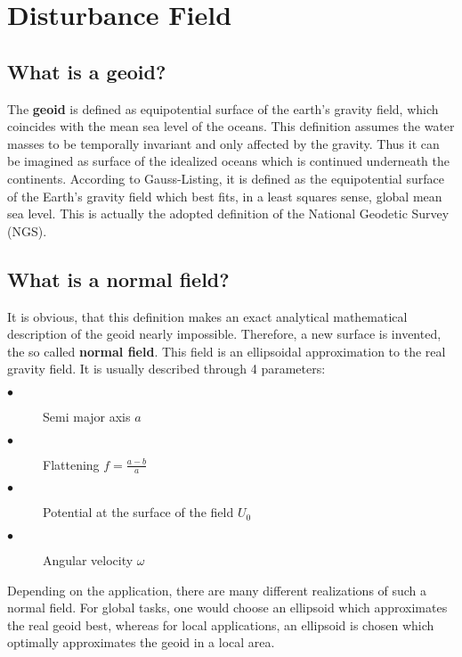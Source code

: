 \documentclass[a4paper,12pt]{article}
\begin{document}
\section{Disturbance Field}
\subsection{What is a  geoid?}
The \textbf{geoid} is defined as equipotential surface of the earth’s gravity field, which coincides with the mean sea level of the oceans. This definition assumes the water masses to be temporally invariant and only affected by the gravity. Thus it can be imagined as surface of the idealized oceans which is continued underneath the continents. According to Gauss-Listing, it is defined as the equipotential surface of the Earth’s gravity field which best fits, in a least squares sense, global mean sea level. This is actually the adopted definition of the National Geodetic Survey (NGS).\\

\subsection{What is a normal field?}
It is obvious, that this definition makes an exact analytical mathematical description of the geoid nearly impossible. Therefore, a new surface is invented, the so called \textbf{normal field}. This field is an ellipsoidal approximation to the real gravity field. It is usually described through 4 parameters:
\begin{description}
\item[$\bullet$]Semi major axis $a$
\item[$\bullet$]Flattening $f=\frac{a-b}{a}$
\item[$\bullet$]Potential at the surface of the field $U_0$
\item[$\bullet$]Angular velocity $\omega$
\end{description}
Depending on the application, there are many different realizations of such a normal field. For global tasks, one would choose an ellipsoid which approximates the real geoid
best, whereas for local applications, an ellipsoid is chosen which optimally approximates the geoid in a local area.\\
\end{document}
